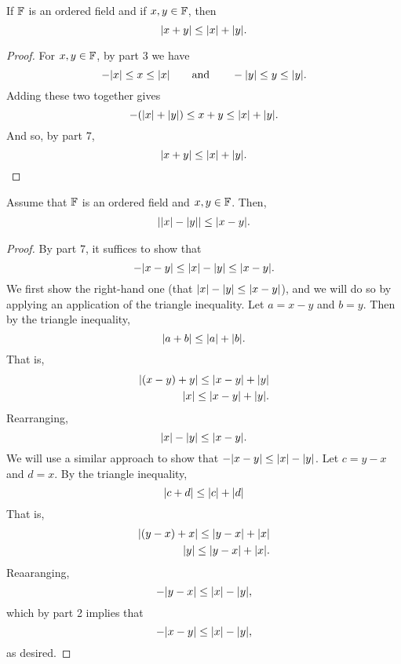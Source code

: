 \documentclass[11pt,twoside=off,numbers=noenddot]{scrbook}
\begin{document}
\begin{theorem}
    If $\mathbb F$ is an ordered field and if $x, y \in \mathbb F$, then
    \[ | x + y | \leq | x | + | y |. \]
\end{theorem}

\begin{proof}
    For $x, y \in \mathbb F$, by  part 3 we have
    \[ -| x | \leq x \leq | x | \qquad \text{and} \qquad -| y | \leq y \leq | y |. \]
    Adding these two together gives
    \[ -(| x | + | y |) \leq x + y \leq | x | + | y |. \]
    And so, by  part 7,
    \[ | x + y | \leq | x | + | y |. \]
\end{proof}

\begin{corollary}
    Assume that $\mathbb F$ is an ordered field and $x, y \in \mathbb F$. Then,
    \begin{align*}
        | | x | - | y | | \leq | x - y |.
    \end{align*}
\end{corollary}

\begin{proof}
    By  part 7, it suffices to show that
    \[ -| x - y | \leq | x | - | y | \leq | x - y |. \]
    We first show the right-hand one (that $| x | - | y | \leq | x - y |$), and we will do so by applying an application of the triangle inequality. Let $a = x - y$ and $b = y$. Then by the triangle inequality,
    \[ | a + b | \leq | a | + | b |. \]
    That is,
    \begin{align*}
        | (x - y) + y | \leq | x - y | + | y | \\
        | x | \leq | x - y | + | y |.
    \end{align*}
    Rearranging,
    \[ | x | - | y | \leq | x - y |. \]
    We will use a similar approach to show that $-| x - y | \leq | x | - | y |$. Let $c = y - x$ and $d = x$. By the triangle inequality,
    \[ | c + d | \leq | c | + | d | \]
    That is,
    \begin{align*}
        | (y - x) + x | \leq | y - x | + | x | \\
        | y | \leq | y - x | + | x |.
    \end{align*}
    Reaaranging,
    \[ -| y - x | \leq | x | - | y |, \]
    which by  part 2 implies that
    \[ -| x - y | \leq | x | - | y |, \]
    as desired.
\end{proof}
\end{document}
